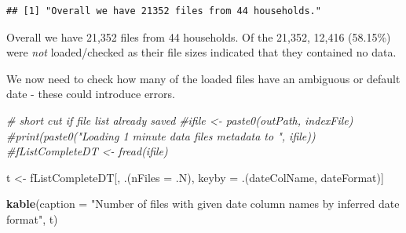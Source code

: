 \documentclass[]{article}
\newenvironment{Shaded}{\begin{snugshade}}{\end{snugshade}}
\newcommand{\KeywordTok}[1]{\textcolor[rgb]{0.13,0.29,0.53}{\textbf{#1}}}
\newcommand{\DataTypeTok}[1]{\textcolor[rgb]{0.13,0.29,0.53}{#1}}
\newcommand{\StringTok}[1]{\textcolor[rgb]{0.31,0.60,0.02}{#1}}
\newcommand{\CommentTok}[1]{\textcolor[rgb]{0.56,0.35,0.01}{\textit{#1}}}
\newcommand{\OperatorTok}[1]{\textcolor[rgb]{0.81,0.36,0.00}{\textbf{#1}}}
\newcommand{\NormalTok}[1]{#1}
\begin{document}
\begin{Shaded}
\end{Shaded}

\begin{verbatim}
## [1] "Overall we have 21352 files from 44 households."
\end{verbatim}

\begin{Shaded}
\end{Shaded}

Overall we have 21,352 files from 44 households. Of the 21,352, 12,416
(58.15\%) were \emph{not} loaded/checked as their file sizes indicated
that they contained no data.

We now need to check how many of the loaded files have an ambiguous or
default date - these could introduce errors.

\begin{Shaded}
\begin{Highlighting}[]
\CommentTok{# short cut if file list already saved}
\CommentTok{#ifile <- paste0(outPath, indexFile)}
\CommentTok{#print(paste0("Loading 1 minute data files metadata to ", ifile))}
\CommentTok{#fListCompleteDT <- fread(ifile)}
  
  
\NormalTok{t <-}\StringTok{ }\NormalTok{fListCompleteDT[, .(}\DataTypeTok{nFiles =}\NormalTok{ .N), keyby =}\StringTok{ }\NormalTok{.(dateColName, dateFormat)]}

\KeywordTok{kable}\NormalTok{(}\DataTypeTok{caption =} \StringTok{"Number of files with given date column names by inferred date format"}\NormalTok{, t)}
\end{Highlighting}
\end{Shaded}
\end{document}
